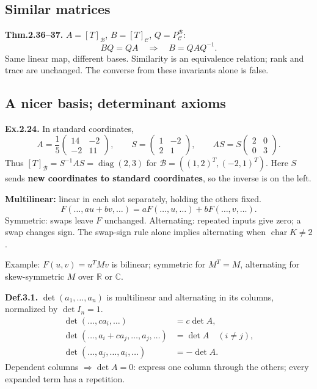 \documentclass[11pt,letterpaper]{article}
\begin{document}
\subsection{Similar matrices}\label{similar-matrices}

\textbf{Thm.2.36--37.} \(A=[T]_{\mathcal B}\), \(B=[T]_{\mathcal C}\),
\(Q=P^{\mathcal B}_{\mathcal C}\): \[
BQ=QA\quad\Rightarrow\quad B=QAQ^{-1}.
\] Same linear map, different bases. Similarity is an equivalence
relation; rank and trace are unchanged. The converse from these
invariants alone is false.

\newpage

\subsection{A nicer basis; determinant
axioms}\label{a-nicer-basis-determinant-axioms}

\textbf{Ex.2.24.} In standard coordinates, \[
A=\frac15\begin{pmatrix}14&-2\\-2&11\end{pmatrix},\qquad
S=\begin{pmatrix}1&-2\\2&1\end{pmatrix},\qquad
AS=S\begin{pmatrix}2&0\\0&3\end{pmatrix}.
\] Thus \([T]_{\mathcal B}=S^{-1}AS=\operatorname{diag}(2,3)\) for
\(\mathcal B=((1,2)^T,(-2,1)^T)\). Here \(S\) sends \textbf{new
coordinates to standard coordinates}, so the inverse is on the left.

\textbf{Multilinear:} linear in each slot separately, holding the others
fixed. \[
F(\ldots,au+bv,\ldots)=aF(\ldots,u,\ldots)+bF(\ldots,v,\ldots).
\] Symmetric: swaps leave \(F\) unchanged. Alternating: repeated inputs
give zero; a swap changes sign. The swap-sign rule alone implies
alternating when \(\operatorname{char}K\ne2\).

Example: \(F(u,v)=u^TMv\) is bilinear; symmetric for \(M^T=M\),
alternating for skew-symmetric \(M\) over \(\mathbb R\) or
\(\mathbb C\).

\textbf{Def.3.1.} \(\det(a_1,\ldots,a_n)\) is multilinear and
alternating in its columns, normalized by \(\det I_n=1\). \[
\begin{aligned}
\det(\ldots,ca_i,\ldots)&=c\det A,\\
\det(\ldots,a_i+ca_j,\ldots,a_j,\ldots)&=\det A\quad(i\ne j),\\
\det(\ldots,a_j,\ldots,a_i,\ldots)&=-\det A.
\end{aligned}
\] Dependent columns \(\Rightarrow\det A=0\): express one column through
the others; every expanded term has a repetition.
\end{document}
